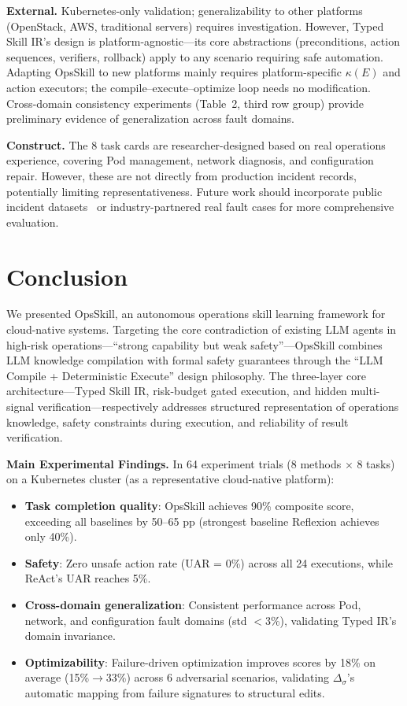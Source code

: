 \documentclass[conference,10pt]{IEEEtran}
\begin{document}
\textbf{External.}
Kubernetes-only validation; generalizability to other platforms (OpenStack, AWS, traditional servers) requires investigation.
However, Typed Skill IR's design is platform-agnostic---its core abstractions (preconditions, action sequences, verifiers, rollback) apply to any scenario requiring safe automation.
Adapting OpsSkill to new platforms mainly requires platform-specific $\kappa(E)$ and action executors; the compile--execute--optimize loop needs no modification.
Cross-domain consistency experiments (Table~2, third row group) provide preliminary evidence of generalization across fault domains.

\textbf{Construct.}
The 8 task cards are researcher-designed based on real operations experience, covering Pod management, network diagnosis, and configuration repair.
However, these are not directly from production incident records, potentially limiting representativeness.
Future work should incorporate public incident datasets~\cite{chen2020incidenttriage} or industry-partnered real fault cases for more comprehensive evaluation.

\section{Conclusion}

We presented OpsSkill, an autonomous operations skill learning framework for cloud-native systems.
Targeting the core contradiction of existing LLM agents in high-risk operations---``strong capability but weak safety''---OpsSkill combines LLM knowledge compilation with formal safety guarantees through the ``LLM Compile + Deterministic Execute'' design philosophy.
The three-layer core architecture---Typed Skill IR, risk-budget gated execution, and hidden multi-signal verification---respectively addresses structured representation of operations knowledge, safety constraints during execution, and reliability of result verification.

\textbf{Main Experimental Findings.}
In 64 experiment trials (8 methods $\times$ 8 tasks) on a Kubernetes cluster (as a representative cloud-native platform):
\begin{itemize}
  \item \textbf{Task completion quality}: OpsSkill achieves 90\% composite score, exceeding all baselines by 50--65 pp (strongest baseline Reflexion achieves only 40\%).
  \item \textbf{Safety}: Zero unsafe action rate (UAR = 0\%) across all 24 executions, while ReAct's UAR reaches 5\%.
  \item \textbf{Cross-domain generalization}: Consistent performance across Pod, network, and configuration fault domains (std $<$3\%), validating Typed IR's domain invariance.
  \item \textbf{Optimizability}: Failure-driven optimization improves scores by 18\% on average (15\%$\to$33\%) across 6 adversarial scenarios, validating $\Delta_\sigma$'s automatic mapping from failure signatures to structural edits.
\end{itemize}
\end{document}
